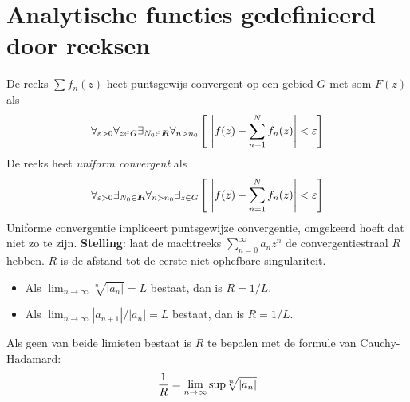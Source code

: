 \section{Analytische functies gedefinieerd door reeksen}
De reeks $\sum f_n(z)$ heet puntsgewijs convergent op een gebied $G$ met som
$F(z)$ als
\[
\forall_{\varepsilon>0}\forall_{z\in G}\exists_{N_0\in I\hspace{-1mm}R}\forall_{n>n_0}
\left[~\left|f(z)-\sum_{n=1}^Nf_n(z)\right|<\varepsilon\right]
\]
De reeks heet {\it uniform convergent} als
\[
\forall_{\varepsilon>0}\exists_{N_0\in I\hspace{-1mm}R}\forall_{n>n_0}\exists_{z\in G}
\left[~\left|f(z)-\sum_{n=1}^Nf_n(z)\right|<\varepsilon\right]
\]
Uniforme convergentie impliceert puntsgewijze convergentie, omgekeerd hoeft
dat niet zo te zijn.
\npar
{\bf Stelling}: laat de machtreeks $\sum\limits_{n=0}^\infty a_nz^n$ de
convergentiestraal $R$ hebben. $R$ is de afstand tot de eerste niet-ophefbare
singulariteit.
\begin{itemize}
\item Als $\displaystyle\lim_{n\rightarrow\infty}\sqrt[n]{|a_n|}=L$ bestaat, dan is $R=1/L$.
\item Als $\displaystyle\lim_{n\rightarrow\infty}|a_{n+1}|/|a_n|=L$ bestaat, dan is $R=1/L$.
\end{itemize}
Als geen van beide limieten bestaat is $R$ te bepalen met de formule van
Cauchy-Hadamard:
\[
\frac{1}{R}=\lim_{n\rightarrow\infty}{\rm sup}\sqrt[n]{|a_n|}
\]

